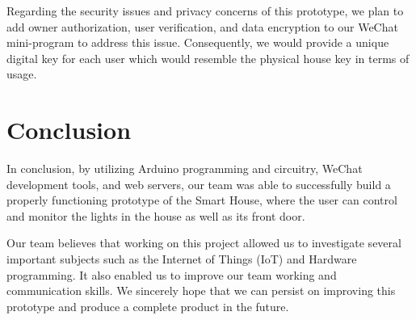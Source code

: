 \documentclass[12pt,a4paper]{report}
\begin{document}
\vspace{0.2cm}

\noindent Regarding the security issues and privacy concerns of this prototype, we plan to add owner authorization, user verification, and data encryption to our WeChat mini-program to address this issue. Consequently, we would provide a unique digital key for each user which would resemble the physical house key in terms of usage.




\chapter{Conclusion}
In conclusion, by utilizing Arduino programming and circuitry, WeChat development tools, and web servers, our team was able to successfully build a properly functioning prototype of the Smart House, where the user can control and monitor the lights in the house as well as its front door.

\vspace{0.2cm}
\noindent Our team believes that working on this project allowed us to investigate several important subjects such as the Internet of Things (IoT) and Hardware programming. It also enabled us to improve our team working and communication skills.  We sincerely hope that we can persist on improving this prototype and produce a complete product in the future. 




\end{document}
